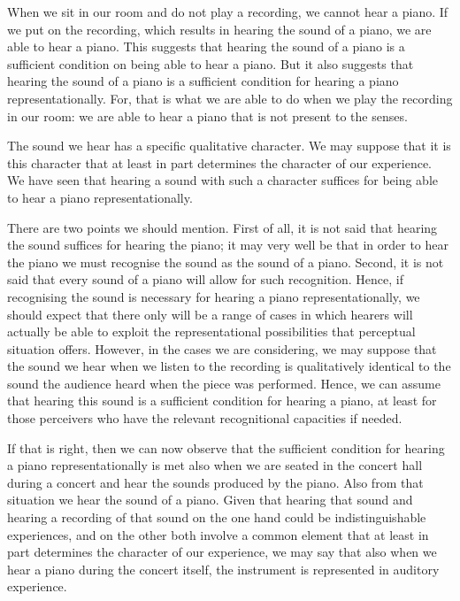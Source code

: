 \documentclass[sloppy, journal, git, bytitle, dodraft]{humapap}
\begin{document}

When we sit in our room and do not play a recording, we cannot hear a piano. If we put on the recording, which results in hearing the sound of a piano, we are able to hear a piano. This suggests that hearing the sound of a piano is a sufficient condition on being able to hear a piano. But it also suggests that hearing the sound of a piano is a sufficient condition for hearing a piano representationally. For, that is what we are able to do when we play the recording in our room: we are able to hear a piano that is not present to the senses.

The sound we hear has a specific qualitative character. We may suppose that it is this character that at least in part determines the character of our experience. We have seen that hearing a sound with such a character suffices for being able to hear a piano representationally. 

There are two points we should mention. First of all, it is not said that hearing the sound suffices for hearing the piano; it may very well be that in order to hear the piano we must recognise the sound as the sound of a piano. Second, it is not said that every sound of a piano will allow for such recognition. Hence, if recognising the sound is necessary for hearing a piano representationally, we should expect that there only will be a range of cases in which hearers will actually be able to exploit the representational possibilities that perceptual situation offers. However, in the cases we are considering, we may suppose that the sound we hear when we listen to the recording is qualitatively identical to the sound the audience heard when the piece was performed. Hence, we can assume that hearing this sound is a sufficient condition for hearing a piano, at least for those perceivers who have the relevant recognitional capacities if needed. 

If that is right, then we can now observe that the sufficient condition for hearing a piano representationally is met also when we are seated in the concert hall during a concert and hear the sounds produced by the piano. Also from that situation we hear the sound of a piano. Given that hearing that sound and hearing a recording of that sound on the one hand could be indistinguishable experiences, and on the other both involve a common element that at least in part determines the character of our experience, we may say that also when we hear a piano during the concert itself, the instrument is represented in auditory experience. 
\end{document}

